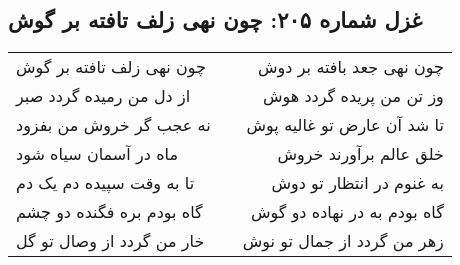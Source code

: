 \begin{center}
\section*{غزل شماره ۲۰۵: چون نهی زلف تافته بر گوش}
\label{sec:205}
\begin{longtable}{l p{0.5cm} r}
چون نهی زلف تافته بر گوش
&&
چون نهی جعد بافته بر دوش
\\
از دل من رمیده گردد صبر
&&
وز تن من پریده گردد هوش
\\
نه عجب گر خروش من بفزود
&&
تا شد آن عارض تو غالیه پوش
\\
ماه در آسمان سیاه شود
&&
خلق عالم برآورند خروش
\\
تا به وقت سپیده دم یک دم
&&
به غنوم در انتظار تو دوش
\\
گاه بودم بره فگنده دو چشم
&&
گاه بودم به در نهاده دو گوش
\\
خار من گردد از وصال تو گل
&&
زهر من گردد از جمال تو نوش
\\
\end{longtable}
\end{center}
